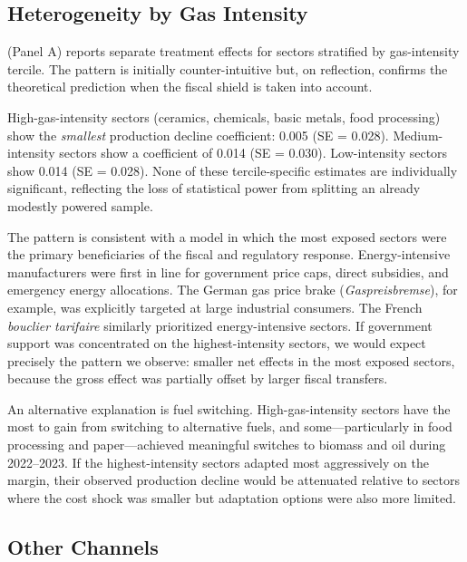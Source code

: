\documentclass[12pt]{article}
\begin{document}
\subsection{Heterogeneity by Gas Intensity}

 (Panel A) reports separate treatment effects for sectors stratified by gas-intensity tercile. The pattern is initially counter-intuitive but, on reflection, confirms the theoretical prediction when the fiscal shield is taken into account.

High-gas-intensity sectors (ceramics, chemicals, basic metals, food processing) show the \textit{smallest} production decline coefficient: 0.005 (SE = 0.028). Medium-intensity sectors show a coefficient of 0.014 (SE = 0.030). Low-intensity sectors show 0.014 (SE = 0.028). None of these tercile-specific estimates are individually significant, reflecting the loss of statistical power from splitting an already modestly powered sample.

The pattern is consistent with a model in which the most exposed sectors were the primary beneficiaries of the fiscal and regulatory response. Energy-intensive manufacturers were first in line for government price caps, direct subsidies, and emergency energy allocations. The German gas price brake (\textit{Gaspreisbremse}), for example, was explicitly targeted at large industrial consumers. The French \textit{bouclier tarifaire} similarly prioritized energy-intensive sectors. If government support was concentrated on the highest-intensity sectors, we would expect precisely the pattern we observe: smaller net effects in the most exposed sectors, because the gross effect was partially offset by larger fiscal transfers.

An alternative explanation is fuel switching. High-gas-intensity sectors have the most to gain from switching to alternative fuels, and some---particularly in food processing and paper---achieved meaningful switches to biomass and oil during 2022--2023. If the highest-intensity sectors adapted most aggressively on the margin, their observed production decline would be attenuated relative to sectors where the cost shock was smaller but adaptation options were also more limited.



\subsection{Other Channels}
\end{document}
